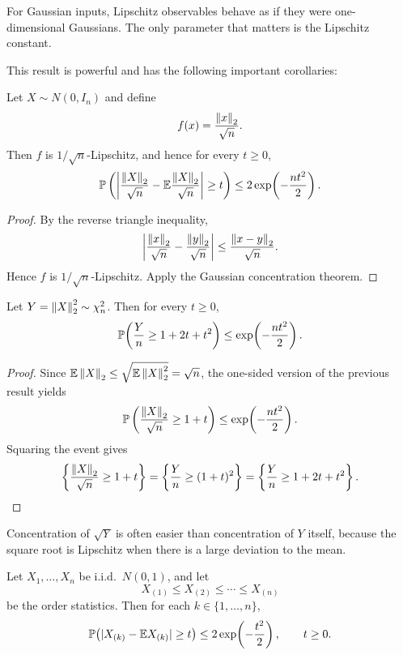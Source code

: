 \begin{remark}
For Gaussian inputs, Lipschitz observables behave as if they were one-dimensional Gaussians. The only parameter that matters is the Lipschitz constant.
\end{remark}

This result is powerful and has the following important corollaries:

\begin{cor}
Let $X\sim N(0,I_n)$ and define
\[
f(x)=\frac{\left\lVert x\right\rVert_2}{\sqrt n}.
\]
Then $f$ is $1/\sqrt n$-Lipschitz, and hence for every $t\ge 0$,
\[
\mathbb{P}\left(
\left|
\frac{\left\lVert X\right\rVert_2}{\sqrt n}
-
\mathbb{E} \frac{\left\lVert X\right\rVert_2}{\sqrt n}
\right|
\ge t
\right)
\le
2\exp\!\left(-\frac{nt^2}{2}\right).
\]
\end{cor}

\begin{proof}
By the reverse triangle inequality,
\[
\left|
\frac{\left\lVert x\right\rVert_2}{\sqrt n}
-
\frac{\left\lVert y\right\rVert_2}{\sqrt n}
\right|
\le
\frac{\left\lVert x-y\right\rVert_2}{\sqrt n}.
\]
Hence $f$ is $1/\sqrt n$-Lipschitz. Apply the Gaussian concentration theorem.
\end{proof}

\begin{cor}
Let $Y=\left\lVert X\right\rVert_2^2\sim \chi_n^2$. Then for every $t\ge 0$,
\[
\mathbb{P}\!\left(
\frac{Y}{n}\ge 1+2t+t^2
\right)
\le
\exp\!\left(-\frac{nt^2}{2}\right).
\]
\end{cor}

\begin{proof}
Since $\mathbb{E} \left\lVert X\right\rVert_2\le \sqrt{\mathbb{E} \left\lVert X\right\rVert_2^2}=\sqrt n$, the one-sided version of the previous result yields
\[
\mathbb{P}\left(\frac{\left\lVert X\right\rVert_2}{\sqrt n}\ge 1+t\right)
\le
\exp\!\left(-\frac{nt^2}{2}\right).
\]
Squaring the event gives
\[
\left\{
\frac{\left\lVert X\right\rVert_2}{\sqrt n}\ge 1+t
\right\}
=
\left\{
\frac{Y}{n}\ge (1+t)^2
\right\}
=
\left\{
\frac{Y}{n}\ge 1+2t+t^2
\right\}.
\]
\end{proof}

\begin{remark}
Concentration of $\sqrt{Y}$ is often easier than concentration of $Y$ itself, because the square root is Lipschitz when there is a large deviation to the mean.
\end{remark}

\begin{cor}
Let $X_1,\dots,X_n$ be i.i.d.\ $N(0,1)$, and let
\[
X_{(1)}\le X_{(2)}\le \cdots \le X_{(n)}
\]
be the order statistics. Then for each $k\in\{1,\dots,n\}$,
\[
\mathbb{P}\bigl(|X_{(k)}-\mathbb{E} X_{(k)}|\ge t\bigr)
\le
2\exp\!\left(-\frac{t^2}{2}\right),
\qquad t\ge 0.
\]
\end{cor}

